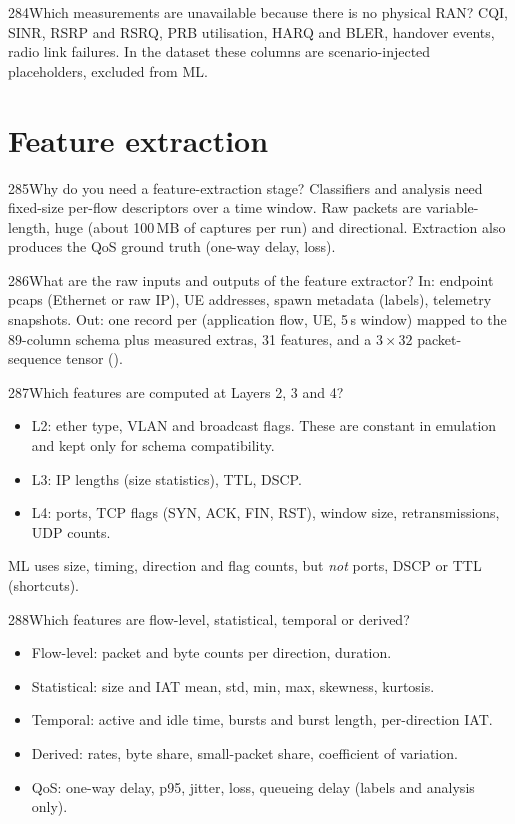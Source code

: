 \begin{qa}{284}{Which measurements are unavailable because there is no physical RAN?}
CQI, SINR, RSRP and RSRQ, PRB utilisation, HARQ and BLER, handover events, radio link failures. In the dataset these
columns are scenario-injected placeholders, excluded from ML.
\end{qa}

\section{Feature extraction}

\FigMeasure

\begin{qa}{285}{Why do you need a feature-extraction stage?}
Classifiers and analysis need fixed-size per-flow descriptors over a time window. Raw packets are variable-length,
huge (about 100\,MB of captures per run) and directional. Extraction also produces the QoS ground truth (one-way
delay, loss).
\end{qa}

\begin{qa}{286}{What are the raw inputs and outputs of the feature extractor?}
In: endpoint pcaps (Ethernet or raw IP), UE addresses, spawn metadata (labels), telemetry snapshots.
Out: one record per (application flow, UE, 5\,s window) mapped to the 89-column schema plus measured extras, 31
 features, and a $3\times32$ packet-sequence tensor ().
\end{qa}

\begin{qa}{287}{Which features are computed at Layers 2, 3 and 4?}
\begin{itemize}
\item L2: ether type, VLAN and broadcast flags. These are constant in emulation and kept only for schema compatibility.
\item L3: IP lengths (size statistics), TTL, DSCP.
\item L4: ports, TCP flags (SYN, ACK, FIN, RST), window size, retransmissions, UDP counts.
\end{itemize}
ML uses size, timing, direction and flag counts, but \emph{not} ports, DSCP or TTL (shortcuts).
\end{qa}

\begin{qa}{288}{Which features are flow-level, statistical, temporal or derived?}
\begin{itemize}
\item Flow-level: packet and byte counts per direction, duration.
\item Statistical: size and IAT mean, std, min, max, skewness, kurtosis.
\item Temporal: active and idle time, bursts and burst length, per-direction IAT.
\item Derived: rates, byte share, small-packet share, coefficient of variation.
\item QoS: one-way delay, p95, jitter, loss, queueing delay (labels and analysis only).
\end{itemize}
\end{qa}

